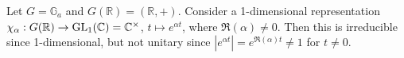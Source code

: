 \begin{problem}
Let $G = \mathbb{G}_a$ and $G(\mathbb{R}) = (\mathbb{R}, +)$.
Consider a 1-dimensional representation $\chi_{\alpha}: G(\mathbb{R}) \to \operatorname{\mathrm{GL}}_1(\mathbb{C}) = \mathbb{C}^{\times}$, $t \mapsto e^{\alpha t}$, where $\Re(\alpha) \neq 0$.
Then this is irreducible since 1-dimensional, but not unitary since $|e^{\alpha t}| = e^{\Re (\alpha) t} \neq 1$ for $t\neq 0$.
\end{problem}

\begin{problem} \notfinish
\end{problem}

\begin{problem} \notfinish
\end{problem}

\begin{problem} \notfinish
\end{problem}

\begin{problem} \notfinish
\end{problem}

\begin{problem} \notfinish
\end{problem}

\begin{problem} \notfinish
\end{problem}

\begin{problem} \notfinish
\end{problem}
